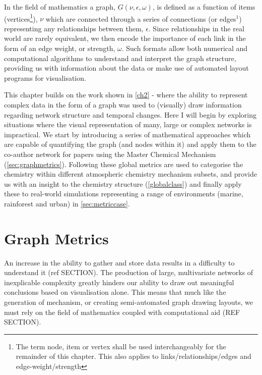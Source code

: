 In the field of mathematics a graph, $G(\nu,\epsilon,\omega)$, is defined as a function of items (vertices\footnote{The term node, item or vertex shall be used interchangeably for the remainder of this chapter. This also applies to links/relationships/edges and edge-weight/strength}), $\nu$ which are connected through a series of connections (or edges$^1$) representing any relationships between them, $\epsilon$. Since relationships in the real world are rarely equivalent, we then encode the importance of each link in the form of an edge weight, or strength, $\omega$. Such formats allow both numerical and computational algorithms to understand and interpret the graph structure, providing us with information about the data or make use of automated layout programs for visualisation. 


This chapter builds on the work shown in \autoref{ch2} - where 
the ability to represent complex data in the form of a graph was used to (visually) draw information regarding network structure and temporal changes. Here I will begin by exploring situations where the visual representation of many, large or complex networks is impractical. We start by introducing a series of mathematical approaches which are capable of quantifying the graph (and nodes within it) and apply them to the co-author network for papers using the Master Chemical Mechanism (\autoref{sec:graphmetrics}). Following these global metrics are used to categorise the chemistry within different atmospheric chemistry mechanism subsets, and provide us with an insight to the chemistry structure (\autoref{globalclass}) and finally apply these to real-world simulations representing a range of environments (marine, rainforest and urban) in \autoref{sec:metriccase}.
% 
% 
% 

\section{Graph Metrics}\label{sec:graphmetrics}

An increase in the ability to gather and store data results in a difficulty to understand it (ref SECTION). The production of large, multivariate networks of inexplicable complexity greatly hinders our ability to draw out meaningful conclusions based on visualisation alone. This means that much like the generation of mechanism, or creating semi-automated graph drawing layouts, we must rely on the field of mathematics coupled with computational aid (REF SECTION).

